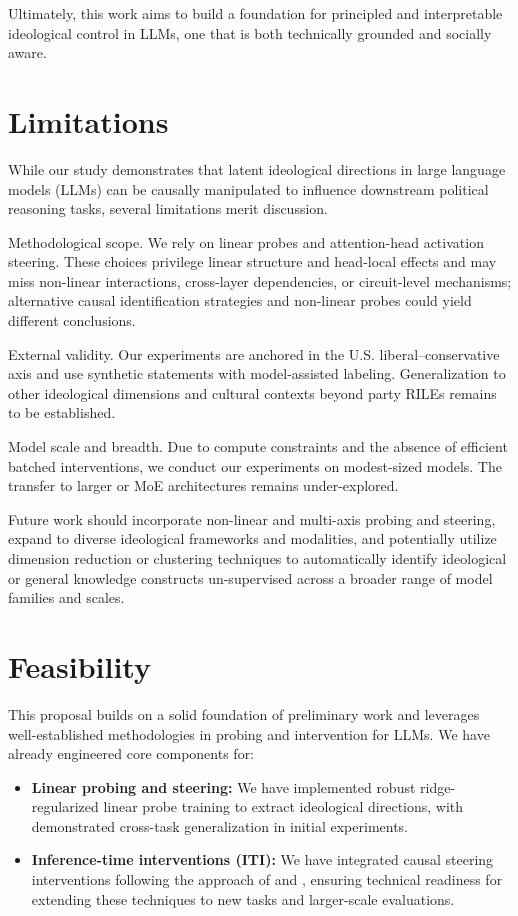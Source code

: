 \documentclass[11pt]{article}
\begin{document}
Ultimately, this work aims to build a foundation for principled and interpretable ideological control in LLMs, one that is both technically grounded and socially aware.

\section*{Limitations}

While our study demonstrates that latent ideological directions in large language models (LLMs) can be causally manipulated to influence downstream political reasoning tasks, several limitations merit discussion.

Methodological scope. We rely on linear probes and attention-head activation steering. These choices privilege linear structure and head-local effects and may miss non-linear interactions, cross-layer dependencies, or circuit-level mechanisms; alternative causal identification strategies and non-linear probes could yield different conclusions.

External validity. Our experiments are anchored in the U.S. liberal--conservative axis and use synthetic statements with model-assisted labeling. Generalization to other ideological dimensions and cultural contexts beyond party RILEs remains to be established.

Model scale and breadth. Due to compute constraints and the absence of efficient batched interventions, we conduct our experiments on modest-sized models. The transfer to larger or MoE architectures remains under-explored.

Future work should incorporate non-linear and multi-axis probing and steering, expand to diverse ideological frameworks and modalities, and potentially utilize dimension reduction or clustering techniques to automatically identify ideological or general knowledge constructs un-supervised across a broader range of model families and scales.

\section*{Feasibility}

This proposal builds on a solid foundation of preliminary work and leverages well-established methodologies in probing and intervention for LLMs. We have already engineered core components for:

\begin{itemize}
    \item \textbf{Linear probing and steering:} We have implemented robust ridge-regularized linear probe training to extract ideological directions, with demonstrated cross-task generalization in initial experiments.
    
    \item \textbf{Inference-time interventions (ITI):} We have integrated causal steering interventions following the approach of \citet{liInferenceTimeInterventionEliciting2023} and \citet{kimLinearRepresentationsPolitical2025}, ensuring technical readiness for extending these techniques to new tasks and larger-scale evaluations.
\end{itemize}
\end{document}
